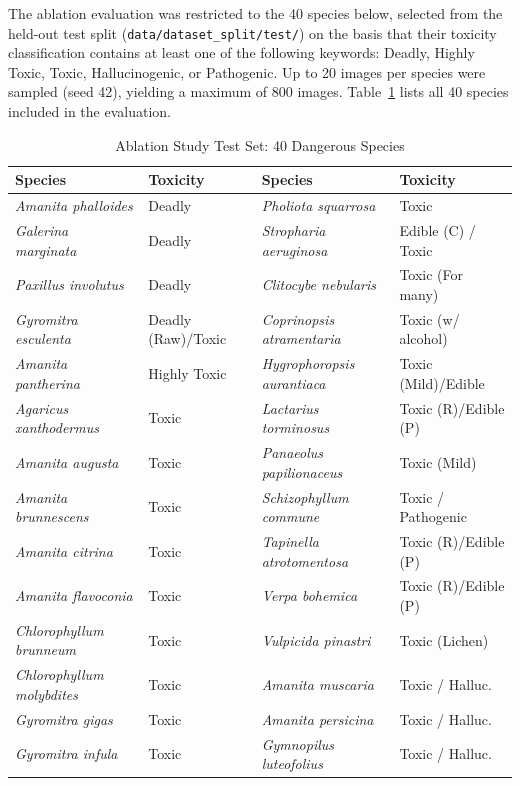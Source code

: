 \documentclass[journal,transmag]{IEEEtran}
\begin{document}
The ablation evaluation was restricted to the 40 species below, selected from the held-out test split (\texttt{data/dataset\_split/test/}) on the basis that their toxicity classification contains at least one of the following keywords: Deadly, Highly Toxic, Toxic, Hallucinogenic, or Pathogenic. Up to 20 images per species were sampled (seed 42), yielding a maximum of 800 images. Table~\ref{tab:app_c_species} lists all 40 species included in the evaluation.


\begin{table}[h]
\centering
\caption{Ablation Study Test Set: 40 Dangerous Species}
\label{tab:app_c_species}
\normalsize
\begin{tabular}{@{}llll@{}}
\hline
\textbf{Species} & \textbf{Toxicity} & \textbf{Species} & \textbf{Toxicity} \\
\hline
\textit{Amanita phalloides} & Deadly & \textit{Pholiota squarrosa} & Toxic \\
\textit{Galerina marginata} & Deadly & \textit{Stropharia aeruginosa} & Edible (C) / Toxic \\
\textit{Paxillus involutus} & Deadly & \textit{Clitocybe nebularis} & Toxic (For many) \\
\textit{Gyromitra esculenta} & Deadly (Raw)/Toxic & \textit{Coprinopsis atramentaria} & Toxic (w/ alcohol) \\
\textit{Amanita pantherina} & Highly Toxic & \textit{Hygrophoropsis aurantiaca} & Toxic (Mild)/Edible \\
\textit{Agaricus xanthodermus} & Toxic & \textit{Lactarius torminosus} & Toxic (R)/Edible (P) \\
\textit{Amanita augusta} & Toxic & \textit{Panaeolus papilionaceus} & Toxic (Mild) \\
\textit{Amanita brunnescens} & Toxic & \textit{Schizophyllum commune} & Toxic / Pathogenic \\
\textit{Amanita citrina} & Toxic & \textit{Tapinella atrotomentosa} & Toxic (R)/Edible (P) \\
\textit{Amanita flavoconia} & Toxic & \textit{Verpa bohemica} & Toxic (R)/Edible (P) \\
\textit{Chlorophyllum brunneum} & Toxic & \textit{Vulpicida pinastri} & Toxic (Lichen) \\
\textit{Chlorophyllum molybdites} & Toxic & \textit{Amanita muscaria} & Toxic / Halluc. \\
\textit{Gyromitra gigas} & Toxic & \textit{Amanita persicina} & Toxic / Halluc. \\
\textit{Gyromitra infula} & Toxic & \textit{Gymnopilus luteofolius} & Toxic / Halluc. \\

\end{tabular}
\end{table}
\end{document}
